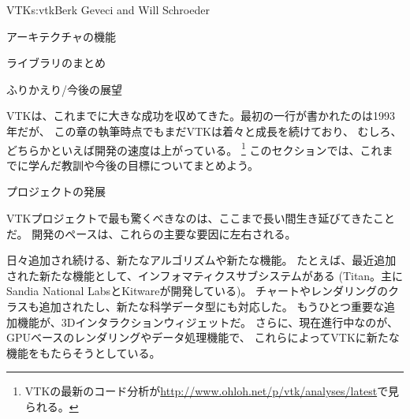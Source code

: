 \begin{aosachapter}{VTK}{s:vtk}{Berk Geveci and Will Schroeder}
\begin{aosasect1}{アーキテクチャの機能}
\begin{aosasect2}{ライブラリのまとめ}
\end{aosasect2}

\end{aosasect1}

\begin{aosasect1}{ふりかえり/今後の展望}

VTKは、これまでに大きな成功を収めてきた。最初の一行が書かれたのは1993年だが、
この章の執筆時点でもまだVTKは着々と成長を続けており、
むしろ、どちらかといえば開発の速度は上がっている。
\footnote{VTKの最新のコード分析が\url{http://www.ohloh.net/p/vtk/analyses/latest}で見られる。}
このセクションでは、これまでに学んだ教訓や今後の目標についてまとめよう。

\begin{aosasect2}{プロジェクトの発展}

VTKプロジェクトで最も驚くべきなのは、ここまで長い間生き延びてきたことだ。
開発のペースは、これらの主要な要因に左右される。

\begin{aosaitemize}

  \item 日々追加され続ける、新たなアルゴリズムや新たな機能。
  たとえば、最近追加された新たな機能として、インフォマティクスサブシステムがある
  (Titan。主にSandia National LabsとKitwareが開発している)。
  チャートやレンダリングのクラスも追加されたし、新たな科学データ型にも対応した。
  もうひとつ重要な追加機能が、3Dインタラクションウィジェットだ。
  さらに、現在進行中なのが、GPUベースのレンダリングやデータ処理機能で、
  これらによってVTKに新たな機能をもたらそうとしている。


\end{aosaitemize}
\end{aosasect2}
\end{aosasect1}
\end{aosachapter}
